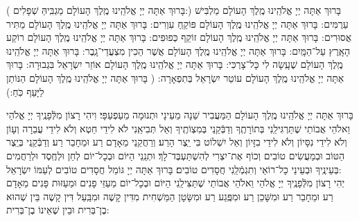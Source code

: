 ( 
בָּרוּךְ אַתָּה יְיָ אֱלֹהֵֽינוּ מֶֽלֶךְ הָעוֹלָם מַגְבִּֽיהַּ שְׁפָלִים:)\hfill \break
בָּרוּךְ אַתָּה יְיָ אֱלֹהֵֽינוּ מֶֽלֶךְ הָעוֹלָם מַלְבִּישׁ עַרֻמִּים:\hfill \break
\hspace*{1em}	בָּרוּךְ אַתָּה יְיָ אֱלֹהֵֽינוּ מֶֽלֶךְ הָעוֹלָם פּוֹקֵֽחַ עִוְרִים:\hfill \break
	בָּרוּךְ אַתָּה יְיָ אֱלֹהֵֽינוּ מֶֽלֶךְ הָעוֹלָם מַתִּיר אֲסוּרִים:\hfill \break
\hspace*{1em}	בָּרוּךְ אַתָּה יְיָ אֱלֹהֵֽינוּ מֶֽלֶךְ הָעוֹלָם זוֹקֵף כְּפוּפִים:\hfill \break
	בָּרוּךְ אַתָּה יְיָ אֱלֹהֵֽינוּ מֶֽלֶךְ הָעוֹלָם רוֹקַע הָאָֽרֶץ עַל־הַמָּֽיִם:\hfill \break
\hspace*{1em}	בָּרוּךְ אַתָּה יְיָ אֱלֹהֵֽינוּ מֶֽלֶךְ הָעוֹלָם אֲשֶׁר הֵכִין מִצְעֲדֵי־גָֽבֶר:\hfill \break
	בָּרוּךְ אַתָּה יְיָ אֱלֹהֵֽינוּ מֶֽלֶךְ הָעוֹלָם שֶׁעָֽשָׂה לִי כָּל־צָרְכִּי:\hfill \break
\hspace*{1em}	בָּרוּךְ אַתָּה יְיָ אֱלֹהֵֽינוּ מֶֽלֶךְ הָעוֹלָם אוֹזֵר יִשְׂרָאֵל בִּגְבוּרָה:\hfill \break
	בָּרוּךְ אַתָּה יְיָ אֱלֹהֵֽינוּ מֶֽלֶךְ הָעוֹלָם עוֹטֵר יִשְׂרָאֵל בְּתִפְאָרָה:\hfill \break
( 
	בָּרוּךְ אַתָּה יְיָ אֱלֹהֵֽינוּ מֶֽלֶךְ הָעוֹלָם הַנּוֹתֵן לַיָּעֵף כֹּֽחַ:)\hfill \break

בָּרוּךְ אַתָּה יְיָ  אֱלֹהֵֽינוּ מֶֽלֶךְ הָעוֹלָם הַמַּעֲבִיר שֵׁנָה מֵעֵינָי וּתְנוּמָה מֵעַפְעַפָּי׃ וִיהִי רָצוֹן מִלְּֿפָנֶֽיךָ יְיָ אֱלֹהַי וֵאלֹהֵי אֲבוֹתַי שֶׁתַּרְגִּילֵֽנִי בְּתוֹרָתֶֽךָ וְדַבְּֿקֵֽנִי בְּמִצְוֹתֶֽיךָ וְאַל תְּבִיאֵֽנִי לֹא לִידֵי חֵטְא וְלֹא לִידֵי עֲבֵרָה וְעָוֹן וְלֹא לִידֵי נִסָּיוֹן וְלֹא לִידֵי בִזָּיוֹן וְאַל יִשְׁלוֹט בִּי יֵֽצֶר הָרַע׃ וְרַחֲקֵֽנִי מֵאָדָם רַע וּמֵחָבֵר רַע׃ וְדַבְּֿקֵֽנִי בְּיֵֽצֶר הַטּוֹב וּבְמַעֲשִׂים טוֹבִים וְכוֹף אֶת־יִצְרִי לְהִשְׁתַּעְבֶּד־לָךְ׃ וּתְנֵֽנִי הַיּוֹם וּבְכָל־יוֹם לְחֵן וּלְחֶֽסֶד וּלְרַחֲמִים בְּעֵינֶֽיךָ וּבְעֵינֵי כָל־רוֹאַי וְתִגְמְֿלֵֽנִי חֲסָדִים טוֹבִים׃ בָּרוּךְ אַתָּה יְיָ  גּוֹמֵל חֲסָדִים טוֹבִים לְעַמּוֹ יִשְׂרָאֵל:\\
יְהִי רָצוֹן מִלְּֿפָנֶֽיךָ יְיָ אֱלֹהַי וֵאלֹהֵי אֲבוֹתַי שֶׁתַּצִּילֵֽנִי הַיּוֹם וּבְכָל־יוֹם מֵעַזֵּי פָנִים וּמֵעַזּוּת פָּנִים מֵאָדָם רַע וּמֵחָבֵר רַע וּמִשָּׁכֵן רַע וּמִפֶּֽגַע רַע וּמִשָּׂטָן הַמַּשְׁחִית מִדִּין קָשֶׁה וּמִבַּֽעַל דִּין קָשֶׁה בֵּין שְׁהוּא בֶן־בְּרִית וּבֵין שֶׁאֵינוֹ בֶן־בְּרִית:


